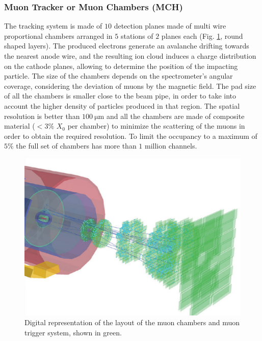 \subsubsection{Muon Tracker or Muon Chambers (MCH)}
The tracking system is made of $10$ detection planes made of multi wire proportional chambers arranged in $5$ stations of $2$ planes each (Fig. \ref{fig:mch_mtr}, round shaped layers).
The produced electrons generate an avalanche drifting towards the nearest anode wire, and the resulting ion cloud induces a charge distribution on the cathode planes, allowing to determine the position of the impacting particle.
The size of the chambers depends on the spectrometer’s angular coverage, considering the deviation of muons by the magnetic field.
The pad size of all the chambers is smaller close to the beam pipe, in order to take into account the higher density of particles produced in that region.
The spatial resolution is better than $100\ \mathrm{\mu m}$ and all the chambers are made of composite material ($< 3\%$ $X_0$ per chamber) to minimize the scattering of the muons in order to obtain the required resolution. 
To limit the occupancy to a maximum of $5\%$ the full set of chambers has more than $1$ million channels.

\begin{figure}[!h]
\begin{center}
\includegraphics[width=\linewidth]{Chapters/Introduction/Figs/muon_mtr_mch.pdf}
\caption{Digital representation of the layout of the muon chambers and muon trigger system, shown in green.}
\label{fig:mch_mtr}
\end{center}
\end{figure}

